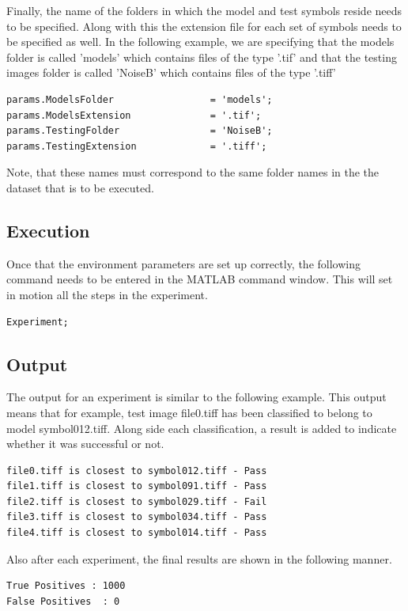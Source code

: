 Finally, the name of the folders in which the model and test symbols reside needs to be specified. Along with this the extension file for each set of symbols needs to be specified as well. In the following example, we are specifying that the models folder is called 'models' which contains files of the type '.tif' and that the testing images folder is called 'NoiseB' which contains files of the type '.tiff' \\

\begin{lstlisting}
params.ModelsFolder                 = 'models';
params.ModelsExtension              = '.tif';
params.TestingFolder                = 'NoiseB';
params.TestingExtension             = '.tiff';
\end{lstlisting}

Note, that these names must correspond to the same folder names in the the dataset that is to be executed.

\subsection{Execution}
Once that the environment parameters are set up correctly, the following command needs to be entered in the MATLAB command window. This will set in motion all the steps in the experiment.\\

\begin{lstlisting}
Experiment;
\end{lstlisting}

\subsection{Output}
The output for an experiment is similar to the following example. This output means that for example, test image file0.tiff has been classified to belong to model symbol012.tiff. Along side each classification, a result is added to indicate whether it was successful or not. \\

\begin{lstlisting}
file0.tiff is closest to symbol012.tiff - Pass
file1.tiff is closest to symbol091.tiff - Pass
file2.tiff is closest to symbol029.tiff - Fail
file3.tiff is closest to symbol034.tiff - Pass
file4.tiff is closest to symbol014.tiff - Pass
\end{lstlisting}

Also after each experiment, the final results are shown in the following manner. \\

\begin{lstlisting}
True Positives : 1000
False Positives  : 0
\end{lstlisting}